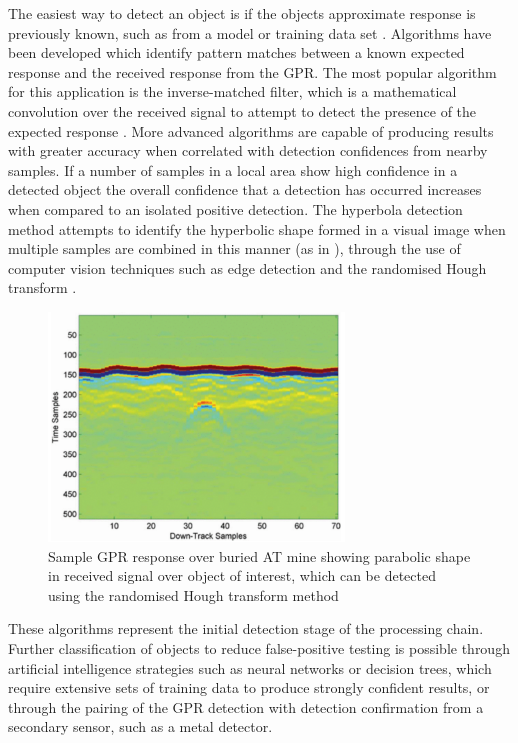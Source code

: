 \documentclass[main.tex]{subfiles}
\begin{document}
The easiest way to detect an object is if the objects approximate response is previously known, such as from a model or training data set \parencite{Yarovoy2009}. Algorithms have been developed which identify pattern matches between a known expected response and the received response from the GPR. The most popular algorithm for this application is the inverse-matched filter, which is a mathematical convolution over the received signal to attempt to detect the presence of the expected response \parencite{Osumi1984}. More advanced algorithms are capable of producing results with greater accuracy when correlated with detection confidences from nearby samples. If a number of samples in a local area show high confidence in a detected object the overall confidence that a detection has occurred increases when compared to an isolated positive detection. The hyperbola detection method attempts to identify the hyperbolic shape formed in a visual image when multiple samples are combined in this manner (as in ), through the use of computer vision techniques such as edge detection and the randomised Hough transform \parencite{Xu1990}.
\begin{figure}[ht]
\includegraphics[width=0.7\textwidth]{3-LiteratureReview/GPR-sample.png}
\centering
\caption{Sample GPR response over buried AT mine showing parabolic shape in received signal over object of interest, which can be detected using the randomised Hough transform method} 
\end{figure}
These algorithms represent the initial detection stage of the processing chain. Further classification of objects to reduce false-positive testing is possible through artificial intelligence strategies such as neural networks or decision trees, which require extensive sets of training data to produce strongly confident results, or through the pairing of the GPR detection with detection confirmation from a secondary sensor, such as a metal detector.
\end{document}
